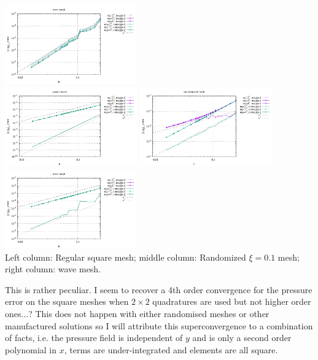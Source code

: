 \begin{center}
\includegraphics[width=5.7cm]{python_codes/fieldstone_76/results/bench3/wave/errors_V}\\
\includegraphics[width=5.7cm]{python_codes/fieldstone_76/results/bench3/reg/errors_P}
\includegraphics[width=5.7cm]{python_codes/fieldstone_76/results/bench3/rand/errors_P}
\includegraphics[width=5.7cm]{python_codes/fieldstone_76/results/bench3/wave/errors_P}\\
{\captionfont Left column: Regular square mesh; middle column: Randomized $\xi=0.1$ mesh;
right column: wave mesh.}
\end{center}

This is rather peculiar. I seem to recover 
a 4th order convergence for the pressure error on the square meshes when 
$2\times 2$ quadratures are used but not higher order ones...? 
This does not happen with either randomised meshes or 
other manufactured solutions so I will attribute this superconvergence 
to a combination of facts, i.e. the pressure field is independent 
of $y$ and is only a second order polynomial in $x$, 
terms are under-integrated and elements are all square. 

